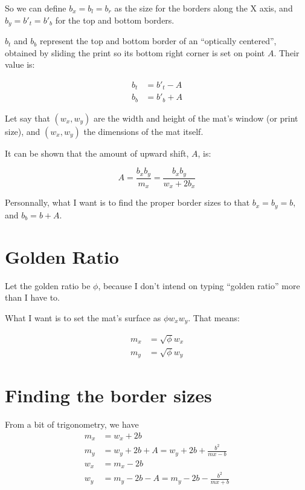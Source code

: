 \documentclass[
    paper=letter,
    parskip=half-,
    DIV=10,
]{scrartcl}
\begin{document}
    So we can define $b_x = b_l = b_r$ as the size for the borders along the X axis, and $b_y = b'_t = b'_b$ for the top and bottom borders.

    $b_t$ and $b_b$ represent the top and bottom border of an “optically centered”, obtained by sliding the print so its bottom right corner is set on point $A$. Their value is:

    \begin{align*}
        b_t &= b'_t - A \\
        b_b &= b'_b + A
    \end{align*}

    Let say that $(w_x, w_y)$ are the width and height of the mat’s window (or print size), and $(w_x, w_y)$ the dimensions of the mat itself.

    It can be shown that the amount of upward shift, $A$, is:

    \[
        A = \frac{b_x b_y}{m_x} = \frac{b_x b_y}{w_x + 2b_x}
    \]


    Personnally, what I want is to find the proper border sizes to that $b_x = b_y = b$, and $b_b = b + A$.


\section{Golden Ratio}

    Let the golden ratio be $\phi$, because I don’t intend on typing “golden ratio” more than I have to.

    What I want is to set the mat’s surface as $\phi w_x w_y$. That means:

    \newcommand{\sphi}{\sqrt{\phi}}
    \begin{align*}
        m_x &= \sphi w_x \\
        m_y &= \sphi w_y
    \end{align*}

\section{Finding the border sizes}

    From a bit of trigonometry, we have
    \begin{align}
        m_x &= w_x + 2b \\
        m_y &= w_y + 2b + A = w_y + 2b + \frac{b^2}{mx - b} \\
        w_x &= m_x - 2b \\
        w_y &= m_y - 2b - A = m_y - 2b - \frac{b^2}{mx + b}
    \end{align}
\end{document}
